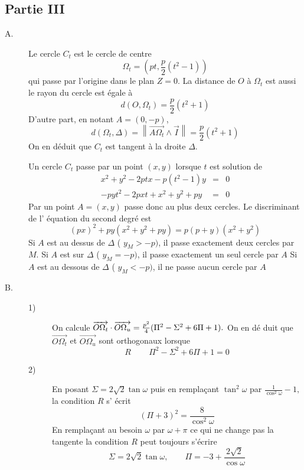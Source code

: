 \subsection{Partie III}

\begin{description}
\item[A.]  Le cercle $C_{t}$ est le cercle de centre 
\[
\Omega _{t}=(pt,\frac{p}{2}(t^{2}-1))
\]
qui passe par l'origine dans le plan $Z=0$. La distance de $O$ \`{a} $\Omega
_{t}$ est aussi le rayon du cercle est \'{e}gale \`{a}
\[
d(O,\Omega _{t})=\frac{p}{2}(t^{2}+1)
\]
D'autre part, en notant $A=(0,-p)$, 
\[
d(\Omega _{t},\Delta )=\left\| \overrightarrow{A\Omega _{t}}\wedge 
\overrightarrow{I}\right\| =\frac{p}{2}(t^{2}+1)
\]
On en d\'{e}duit que $C_{t}$ est tangent \`{a} la droite $\Delta $.

Un cercle $C_{t}$ passe par un point $(x,y)$ lorsque $t$ est solution de 
\begin{eqnarray*}
x^{2}+y^{2}-2ptx-p(t^{2}-1)y &=&0 \\
-pyt^{2}-2pxt+x^{2}+y^{2}+py &=&0
\end{eqnarray*}
Par un point $A=(x,y)$ passe donc au plus deux cercles. Le discriminant de l'%
\'{e}quation du second degr\'{e} est 
\[
(px)^{2}+py(x^{2}+y^{2}+py)=p(p+y)(x^{2}+y^{2})
\]
Si $A$ est au dessus de $\Delta $ ( $y_{M}>-p)$, il passe exactement deux
cercles par $M.$\newline
Si $A$ est sur $\Delta $ ( $y_{M}=-p)$, il passe exactement un seul cercle
par $A$\newline
Si $A$ est au dessous de $\Delta $ ( $y_{M}<-p)$, il ne passe aucun cercle
par $A$

\item[B.] 
\begin{description}
\item[1)]  On calcule $\overrightarrow{O\Omega _{t}}\cdot \overrightarrow{%
O\Omega _{u}}=\frac{p^{2}}{4}(\Pi ^{2}-\Sigma ^{2}+6\Pi +1).$ On en d\'{e}%
duit que $\overrightarrow{O\Omega _{t}}$ et $\overrightarrow{O\Omega _{u}}$
sont orthogonaux lorsque 
\[
R\,\qquad \Pi ^{2}-\Sigma ^{2}+6\Pi +1=0
\]

\item[2)]  En posant $\Sigma =2\sqrt{2}\tan \omega $ puis en rempla\c{c}ant $%
\tan ^{2}\omega $ par $\frac{1}{\cos ^{2}\omega }-1,$ la condition $R$ s'%
\'{e}crit 
\[
(\Pi +3)^{2}=\frac{8}{\cos ^{2}\omega }
\]
En rempla\c{c}ant au besoin $\omega $ par $\omega +\pi $ ce qui ne change
pas la tangente la condition $R$ peut toujours s'\'{e}crire 
\[
\Sigma =2\sqrt{2}\tan \omega ,\qquad \Pi =-3+\frac{2\sqrt{2}}{\cos \omega }
\]
\end{description}


\end{description}
